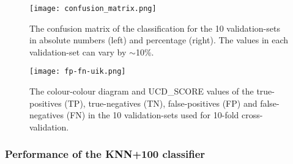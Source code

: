 \documentclass[fleqn,usenatbib]{mnras}
\begin{document}
\begin{figure}
\centering
        \texttt{[image: confusion\_matrix.png]}\\
\caption{The confusion matrix of the classification for the 10 validation-sets in absolute numbers (left) and percentage (right). The values in each validation-set can vary by $\sim$10\%.}
\label{matrix}
\end{figure}

\begin{figure*}
        \texttt{[image: fp-fn-uik.png]}
\caption{The colour-colour diagram and UCD\_SCORE values of the true-positives (TP), true-negatives (TN), false-positives (FP) and false-negatives (FN) in the 10 validation-sets used for 10-fold cross-validation. }
\label{fpfn}
\end{figure*}

\subsubsection{Performance of the KNN+100 classifier}

\end{document}
